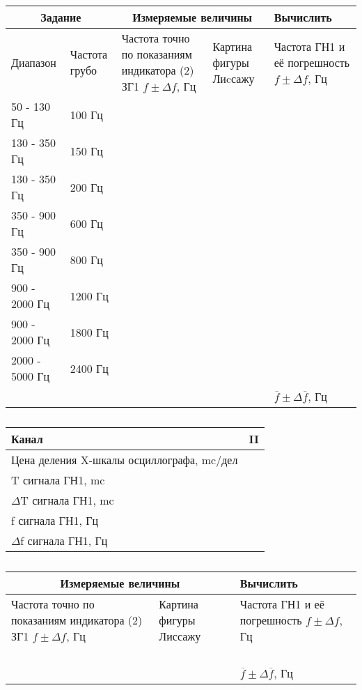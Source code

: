 \documentclass[a4paper,12pt]{article}
\begin{document}
\begin{table}[h]
	\caption{}
	\begin{tabularx}{\textwidth}{|X|X|X|X|X|}
		\hline
		\multicolumn{2}{|c|}{Задание} & 		\multicolumn{2}{|c|}{Измеряемые величины} & Вычислить \\ \hline
		Диапазон & Частота грубо & Частота точно по показаниям индикатора (2) ЗГ1 $f \pm \Delta f$, Гц & Картина фигуры Лиcсажу & Частота ГН1 и её погрешность $f \pm \Delta f$, Гц \\ \hline
		50 - 130 Гц & 100 Гц & & & \\ \hline
		130 - 350 Гц & 150 Гц & & & \\ \hline
		130 - 350 Гц & 200 Гц & & & \\ \hline
		350 - 900 Гц & 600 Гц & & & \\ \hline
		350 - 900 Гц & 800 Гц & & & \\ \hline
		900 - 2000 Гц & 1200 Гц & & & \\ \hline
		900 - 2000 Гц & 1800 Гц & & & \\ \hline
		2000 - 5000 Гц & 2400 Гц & & & \\ \hline		
		& & & & $\overline{f} \pm \Delta \overline{f}$, Гц \\ \hline 
	\end{tabularx}
\end{table}

\begin{table}[h]
	\caption{}
	\begin{tabularx}{\textwidth}{|X|X|}
		\hline 
		Канал & II \\ 
		\hline 
		Цена деления X-шкалы осциллографа, mc/дел &  \\ 
		\hline 
		T сигнала ГН1, mc &  \\ 
		\hline 
		$\Delta$T сигнала ГН1, mc &  \\ 
		\hline 
		f сигнала ГН1, Гц &  \\ 
		\hline 
		$\Delta$f сигнала ГН1, Гц &  \\ 
		\hline 
	\end{tabularx} 
\end{table}


\begin{table}[h]
	\caption{}
	\begin{tabularx}{\textwidth}{|X|X|X|}
		\hline
		\multicolumn{2}{|c|}{Измеряемые величины} & Вычислить \\ \hline
		Частота точно по показаниям индикатора (2) ЗГ1 $f \pm \Delta f$, Гц & Картина фигуры Лиссажу & Частота ГН1 и её погрешность $f \pm \Delta f$, Гц \\ \hline
		& & \\ \hline
		& & \\ \hline
		& & \\ \hline
		& & \\ \hline
		& & $\overline{f} \pm \Delta \overline{f}$, Гц  \\ \hline				
	\end{tabularx}
\end{table}
\end{document}
